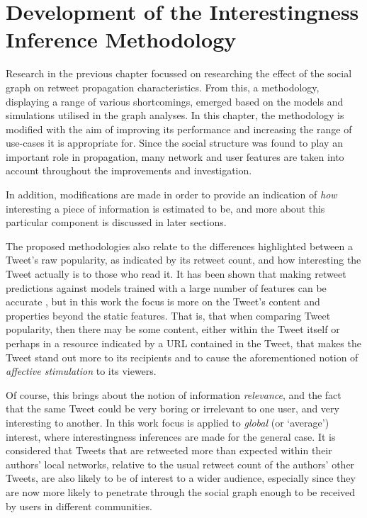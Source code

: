 \chapter{Development of the Interestingness Inference Methodology}

Research in the previous chapter focussed on researching the effect of the social graph on retweet propagation characteristics. From this, a methodology, displaying a range of various shortcomings, emerged based on the models and simulations utilised in the graph analyses. In this chapter, the methodology is modified with the aim of improving its performance and increasing the range of use-cases it is appropriate for. Since the social structure was found to play an important role in propagation, many network and user features are taken into account throughout the improvements and investigation.

In addition, modifications are made in order to provide an indication of \textit{how} interesting a piece of information is estimated to be, and more about this particular component is discussed in later sections.

The proposed methodologies also relate to the differences highlighted between a Tweet's raw popularity, as indicated by its retweet count, and how interesting the Tweet actually is to those who read it. It has been shown that making retweet predictions against models trained with a large number of features can be accurate \cite{zhu11}, but in this work the focus is more on the Tweet's content and properties beyond the static features. That is, that when comparing Tweet popularity, then there may be some content, either within the Tweet itself or perhaps in a resource indicated by a URL contained in the Tweet, that makes the Tweet stand out more to its recipients and to cause the aforementioned notion of \textit{affective stimulation} \cite{xu07} to its viewers.

Of course, this brings about the notion of information \textit{relevance}, and the fact that the same Tweet could be very boring or irrelevant to one user, and very interesting to another. In this work focus is applied to \textit{global} (or `average') interest, where interestingness inferences are made for the general case. It is considered that Tweets that are retweeted more than expected within their authors' local networks, relative to the usual retweet count of the authors' other Tweets, are also likely to be of interest to a wider audience, especially since they are now more likely to penetrate through the social graph enough to be received by users in different communities.
 
